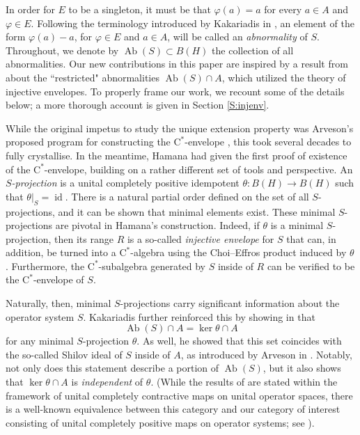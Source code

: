 \documentclass[10pt]{amsart}
\newcommand{\rC}{\mathrm{C}}
\renewcommand{\phi}{\varphi}
\newcommand{\Ab}{\operatorname{Ab}}
\newcommand{\id}{\operatorname{id}}
\theoremstyle{definition}
\begin{document}
In order for $E$ to be a singleton,  it must be that $\phi(a)=a$ for every $a\in A$ and $\phi\in E$. Following the terminology introduced by Kakariadis in \cite{kakariadis2013}, an element of the form  $\phi(a)-a$, for $\phi\in E$ and $a\in A$, will be called an \emph{abnormality} of $S$. Throughout, we denote by $\Ab(S)\subset B(H)$ the collection of all abnormalities.  
 Our new contributions in this paper are inspired by a result from  \cite{kakariadis2013} about the  ``restricted" abnormalities $\Ab(S)\cap A$, which utilized the theory of injective envelopes. To properly frame our work, we recount some of the details below; a more thorough account is given in Section \ref{S:injenv}.

While the original impetus to study the unique extension property was Arveson's proposed program for constructing the $\rC^*$-envelope \cite{arveson1969}, this took several decades to fully crystallise. In the meantime, Hamana \cite{hamana1979} had given the first proof of existence of the $\rC^*$-envelope, building on a rather different set of tools and perspective.  An \emph{$S$-projection} is a unital completely positive idempotent $\theta:B(H)\to B(H)$ such that $\theta|_S=\id$. There is a natural partial order defined on the set of all $S$-projections, and it can be shown that minimal elements exist. These minimal $S$-projections are pivotal in Hamana's construction. Indeed, if $\theta$ is a minimal $S$-projection, then its range $R$ is a so-called \emph{injective envelope} for $S$ that can, in addition, be turned into a $\rC^*$-algebra using the Choi--Effros product induced by $\theta$. Furthermore, the $\rC^*$-subalgebra generated by $S$ inside of $R$ can be verified to be the $\rC^*$-envelope of $S$. 

Naturally, then,  minimal $S$-projections carry significant information about the operator system $S$. Kakariadis further reinforced this by showing in \cite{kakariadis2013} that
\begin{equation}\label{Eq:Kak}
\Ab(S)\cap A=\ker \theta \cap A
\end{equation}
 for any minimal $S$-projection $\theta$. As well, he showed that this set coincides with the so-called Shilov ideal of $S$ inside of $A$, as introduced by Arveson in \cite{arveson1969}. Notably,  not only does this statement describe a portion of $\Ab(S)$, but it also shows that $\ker \theta\cap A$ is \emph{independent} of $\theta$. (While the results of \cite{kakariadis2013} are stated within the framework of unital completely contractive maps on unital operator spaces, there is a well-known equivalence between this category and our category of interest consisting of unital completely positive maps on operator systems; see \cite[Proposition 2.12]{paulsen2002}).
 
\end{document}
